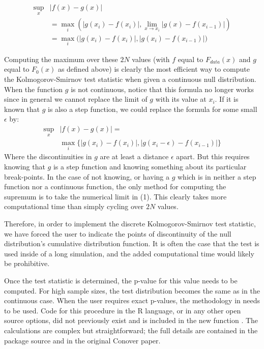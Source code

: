 \begin{align}
\sup_x &\left| f(x)- g(x) \right|   \\
       &= \max_i \left( \left|g(x_i) - f(x_i) \right|, \lim_{x \rightarrow x_i} \left| g(x) - f(x_{i-1}) \right| \right) \\
&=  \max_i \bigg( \left|g(x_i) - f(x_i) \right|, \left| g(x_i) - f(x_{i-1}) \right| \bigg)
\end{align}

Computing the maximum over these $2N$ values (with $f$ equal to $F_{data}(x)$ and $g$ equal to $F_0(x)$ as defined above) is clearly the 
most efficient way to compute the Kolmogorov-Smirnov test statistic when given a continuous null distribution. When the function $g$ is not
continuous, notice that this formula no longer works since in general we cannot replace the limit of $g$ with its value at $x_i$. If it is known that $g$
is also a step function, we could replace the formula for some small $\epsilon$ by:
\begin{align}
\sup_x &\left| f(x)- g(x) \right| =   \\
        &                    \max_i \{ \left|g(x_i) - f(x_i) \right|, \left| g(x_i - \epsilon) - f(x_{i-1}) \right| \}
\end{align}
Where the discontinuities in $g$ are at least a distance $\epsilon$ apart. But this requires knowing that $g$ is a step function and knowing something
about its particular break-points. In the case of not knowing,
or having a $g$ which is in neither a step function nor a continuous function, the only method for computing the supremum is to take the numerical limit in (1). 
This clearly takes more computational time than simply cycling over $2N$ values. 

Therefore, in order to implement the discrete Kolmogorov-Smirnov test statistic, we have forced the user to indicate the points of discontinuity
of the null distribution's cumulative distribution function. It is often the case that the test is used inside of a long simulation, 
and the added computational time would likely be prohibitive. 

Once the test statistic is determined, the p-value for this value needs to be computed. For high sample sizes, the test distribution becomes the same as in the
continuous case. When the user requires exact p-values,
the methodology in \citet{Conover1972} needs to be used. Code for this procedure in the R language, or in any other open source options, did not previously
exist and is included in the new function . The calculations are complex but straightforward; 
the full details are contained in the package source and in the original Conover paper. 

